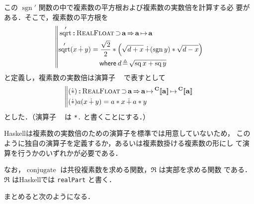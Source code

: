 \documentclass[a5paper,twoside,fleqn,draft]{jsbook}
\def\[{[\![}
\def\]{]\!]}
\DeclareMathOperator{\sgn}{sgn}
\newcommand{\programminglanguage}[1]{\textsf{#1}}
\newcommand{\haskell}{\programminglanguage{Haskell}}
\newcommand{\code}[1]{\texttt{#1}}
\newenvironment{haskellcode}{\begin{itembox}[r]{\haskell}}{\end{itembox}}
\newcommand{\mBrace}{\Vert}
\newcommand{\mKeyword}[1]{\mathsf{#1}}
\newcommand{\mWhereKeyword}{\mKeyword{where}}
\DeclareMathOperator{\mSuperClass}{\Rightarrow}
\DeclareMathOperator{\mSuperSet}{\supset}
\newcommand{\mSpecialFunc}[1]{#1}
\DeclareMathOperator{\mConjugate}{\mSpecialFunc{conjugate}}
\DeclareMathOperator{\mSq}{\mSpecialFunc{sq}}
\DeclareMathOperator{\mSqrt}{\mSpecialFunc{sqrt}}
\DeclareMathOperator{\mComplexPlus}{\dotplus}
\DeclareMathOperator{\mComplexTimes}{\Dot\ast}
\DeclareMathOperator{\mIn}{{:\!:}}
\DeclareMathOperator{\mLetEq}{\triangleq}
\DeclareMathOperator{\mMapsTo}{\mapsto}
\newcommand{\mType}[1]{\mathbf{#1}} %
\newcommand{\mA}{\mType{a}}
\newcommand{\mTypeAssemble}[2]{{}^\mType{#1}\[\mType{#2}\]}
\newcommand{\mComplexType}[1]{\mTypeAssemble{C}{#1}}
\newcommand{\mTypeClass}[1]{\textsc{#1}} %
\newcommand{\mRealFloatTypeClass}{\mTypeClass{RealFloat}}
\newcommand{\mProjEXP}[2]{#1\mMapsTo#2} %
\newcommand{\mWhereIsEXP}[2]{\mathbin{\mWhereKeyword}#1\mLetEq#2} %
\begin{document}
この $\sgn'$ 関数の中で複素数の平方根および複素数の実数倍を計算する必
要がある．そこで，複素数の平方根を
\begin{equation}
  \left\mBrace
  \begin{aligned}
    &\mSqrt'\mIn\mRealFloatTypeClass\mSuperSet\mA
    \mSuperClass\mProjEXP{\mA }{\mA }\\
    &\begin{aligned}
       \mSqrt'(x\mComplexPlus y)
       &=\frac{\sqrt{2}}{2}*\left(\sqrt{d+x}\mComplexPlus(\sgn y)*\sqrt{d-x}\right)\\
       &\quad\mWhereIsEXP{d}{\sqrt{\mSq x+\mSq y}}
     \end{aligned}
  \end{aligned}
  \right.
\end{equation}
と定義し，複素数の実数倍は演算子 $\mComplexTimes$ で表すとして
\begin{equation}
  \left\mBrace
  \begin{aligned}
    &(\mComplexTimes)\mIn\mRealFloatTypeClass\mSuperSet\mA \mSuperClass
    \mProjEXP{\mA }{\mProjEXP{\mComplexType{a}}{\mComplexType{a}}}\\
    &(\mComplexTimes)a(x\mComplexPlus y)=a*x\mComplexPlus a*y
  \end{aligned}
  \right.
\end{equation}
とした．（演算子 $\mComplexTimes$ は \code{*.} と書くことにする．）

\haskell は複素数の実数倍のための演算子を標準では用意していないため，
このように独自の演算子を定義するか，あるいは複素数掛ける複素数の形にし
て演算を行うかのいずれかが必要である．


なお，$\mConjugate$ は共役複素数を求める関数，$\Re$ は実部を求める関数
である．$\Re$ は\haskell では \code{realPart} と書く．

まとめると次のようになる．
\end{document}
